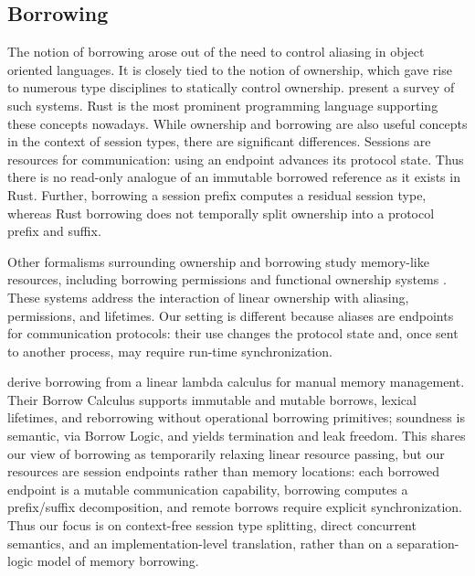 \subsection{Borrowing}
\label{sec:borrowing}

The notion of borrowing arose out of the need to control
aliasing in object oriented languages. It is closely tied to the notion of
ownership, which gave rise to numerous type disciplines to statically control
ownership. \citet{DBLP:series/lncs/ClarkeOSW13} present a survey of such
systems. Rust \cite{team24:_rust_progr_languag} is the most prominent
programming language supporting these concepts nowadays.
%
While ownership and borrowing are also useful concepts in the context
of session types, there are significant differences. Sessions are
resources for communication: using an endpoint advances its protocol
state. Thus there is no read-only analogue of an immutable borrowed
reference as it exists in Rust. Further, borrowing a session prefix
computes a residual session type, whereas Rust borrowing does not
temporally split ownership into a protocol prefix and suffix.

Other formalisms surrounding ownership and borrowing study
memory-like resources, including borrowing permissions
\cite{DBLP:conf/popl/NadenBAB12} and functional ownership systems
\cite{DBLP:journals/corr/abs-2310-18166}.
These systems address the interaction of linear ownership with
aliasing, permissions, and lifetimes. Our setting is different because
aliases are endpoints for communication protocols: their use changes
the protocol state and, once sent to another process, may require
run-time synchronization.

\citet{DBLP:journals/pacmpl/WagnerGML025} derive borrowing from a
linear lambda calculus for manual memory management. Their Borrow
Calculus supports immutable and mutable borrows, lexical lifetimes, and
reborrowing without operational borrowing primitives; soundness is
semantic, via Borrow Logic, and yields termination and leak freedom.
This shares our view of borrowing as temporarily relaxing linear
resource passing, but our resources are session endpoints rather than
memory locations: each borrowed endpoint is a mutable communication
capability, borrowing computes a prefix/suffix decomposition, and
remote borrows require explicit synchronization. Thus our focus is on
context-free session type splitting, direct concurrent semantics, and
an implementation-level translation, rather than on a separation-logic
model of memory borrowing.

